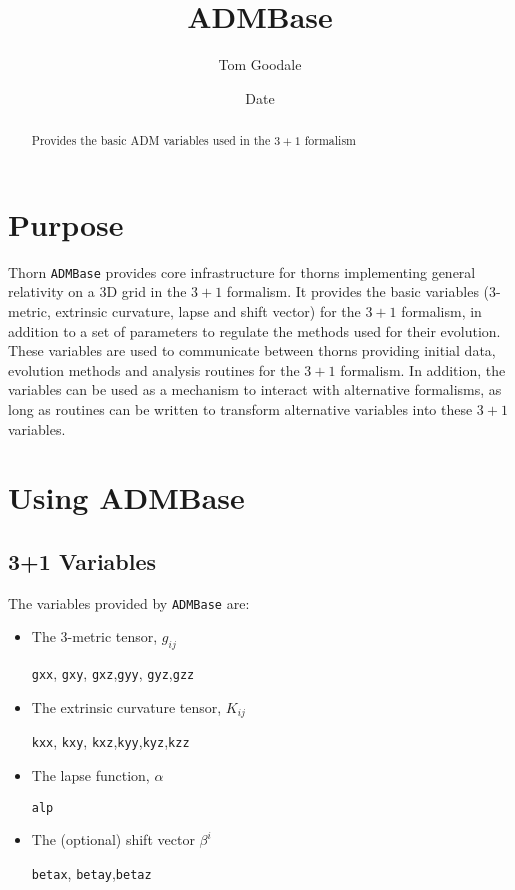 \documentclass{article}
\begin{document}
\title{ADMBase}
\author{Tom Goodale}
\date{$ $Date$ $}

\maketitle


\begin{abstract}
Provides the basic ADM variables used in the $3+1$ formalism
\end{abstract}

\section{Purpose}

Thorn {\tt ADMBase} provides core infrastructure for thorns
implementing general relativity on a 3D grid in the $3+1$
formalism. It provides the basic variables (3-metric, extrinsic
curvature, lapse and shift vector) for the $3+1$ formalism, in
addition to a set of parameters to regulate the methods used for their
evolution. These variables are used to communicate between thorns
providing initial data, evolution methods and analysis routines for
the $3+1$ formalism. In addition, the variables can be used as a
mechanism to interact with alternative formalisms, as long as routines
can be written to transform alternative variables into these $3+1$
variables.


\section{Using ADMBase}

\subsection{3+1 Variables}

The variables provided by {\tt ADMBase} are:

\begin{itemize}
\item
The 3-metric tensor, $g_{ij}$

 {\tt gxx}, {\tt gxy}, {\tt gxz},{\tt gyy}, {\tt gyz},{\tt gzz}

\item The extrinsic curvature tensor, $K_{ij}$ 

{\tt kxx}, {\tt kxy}, {\tt kxz},{\tt kyy},{\tt kyz},{\tt kzz}

\item The lapse function, $\alpha$

 {\tt alp}

\item The (optional) shift vector $\beta^i$ 

{\tt betax}, {\tt betay},{\tt betaz}

\end{itemize}
\end{document}

